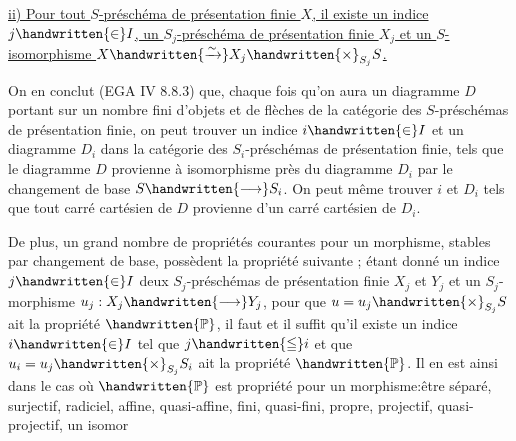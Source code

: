\uline{ii) Pour tout $S$-préschéma de présentation finie $X$, il existe un indice $j\handwritten{\in}I$,  un $S_j$-préschéma de présentation finie $X_j$ et un $S$-isomorphisme $X\handwritten{\xrightarrow{\sim}}X_j\handwritten{\times}_{S_j}S$.}

On en conclut (EGA IV 8.8.3) que, chaque fois qu'on aura un diagramme $D$ portant sur un nombre fini d'objets et de flèches de la catégorie des $S$-préschémas de présentation finie, on peut trouver un indice $i\handwritten{\in}I$ et un diagramme $D_i$ dans la catégorie des $S_i$-préschémas de présentation finie, tels que le diagramme $D$ provienne à isomorphisme près du diagramme $D_i$ par le changement de base $S\handwritten{\longrightarrow}S_i$. On peut même trouver $i$ et $D_i$ tels que tout carré cartésien de $D$ provienne d'un carré cartésien de $D_i$.

 De plus, un grand nombre de propriétés  courantes pour un morphisme, stables par changement de base, possèdent la propriété suivante ; étant donné un indice $j\handwritten{\in}I$ deux $S_j$-préschémas de présentation finie $X_j$ et $Y_j$ et un $S_j$-morphisme $u_j:X_j\handwritten{\longrightarrow}Y_j$, pour que $u=u_j\handwritten{\times}_{S_j}S$ ait la propriété $\handwritten{\mathbb{P}}$, il faut et il suffit qu'il existe un indice $i\handwritten{\in}I$ tel que $j\handwritten{\leqq}i$ et que $u_i=u_j\handwritten{\times}_{S_j}S_i$ ait la propriété $\handwritten{\mathbb{P}}$. Il en est ainsi dans le cas où $\handwritten{\mathbb{P}}$ est  propriété pour un morphisme:être séparé, surjectif, radiciel, affine, quasi-affine, fini, quasi-fini, propre, projectif, quasi-projectif, un isomor%
